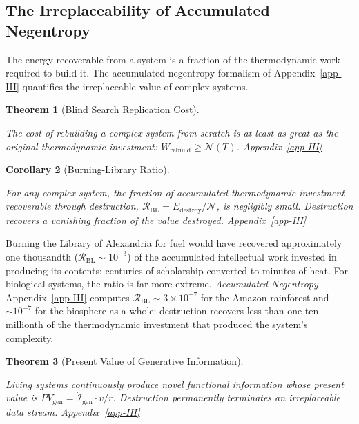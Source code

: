\documentclass[11pt]{article}
\theoremstyle{plain}
\newtheorem{theorem}{Theorem}
\newtheorem{corollary}[theorem]{Corollary}
\theoremstyle{definition}
\theoremstyle{remark}
\let\origsubsection\subsection
\renewcommand{\subsection}{\needspace{7\baselineskip}\origsubsection}
\begin{document}
\subsection{The Irreplaceability of Accumulated
Negentropy}\label{the-irreplaceability-of-accumulated-negentropy}

The energy recoverable from a system is a fraction of the thermodynamic
work required to build it. The accumulated negentropy formalism of
Appendix~\ref{app-III} quantifies the irreplaceable value of complex
systems.

\begin{theorem}[Blind Search Replication Cost]
\label{ethics-thm-replication-cost}

The cost of rebuilding a complex system from scratch is at least as great as the original thermodynamic investment: $W_{\text{rebuild}} \geq \mathcal{N}(T)$. Appendix~\ref{app-III}
\end{theorem}

\begin{corollary}[Burning-Library Ratio]
\label{ethics-cor-burning-library}

For any complex system, the fraction of accumulated thermodynamic investment recoverable through destruction, $\mathcal{R}_{\text{BL}} = E_{\text{destroy}} / \mathcal{N}$, is negligibly small. Destruction recovers a vanishing fraction of the value destroyed. Appendix~\ref{app-III}
\end{corollary}

Burning the Library of Alexandria for fuel would have recovered
approximately one thousandth (\(\mathcal{R}_{\text{BL}} \sim 10^{-3}\))
of the accumulated intellectual work invested in producing its contents:
centuries of scholarship converted to minutes of heat. For biological
systems, the ratio is far more extreme. \emph{Accumulated Negentropy}
Appendix~\ref{app-III} computes
\(\mathcal{R}_{\text{BL}} \sim 3 \times 10^{-7}\) for the Amazon
rainforest and \(\sim 10^{-7}\) for the biosphere as a whole:
destruction recovers less than one ten-millionth of the thermodynamic
investment that produced the system's complexity.

\begin{theorem}[Present Value of Generative Information]
\label{ethics-thm-pv-gen-info}

Living systems continuously produce novel functional information whose present value is $PV_{\text{gen}} = \dot{\mathcal{I}}_{\text{gen}} \cdot v / r$. Destruction permanently terminates an irreplaceable data stream. Appendix~\ref{app-III}
\end{theorem}
\end{document}
